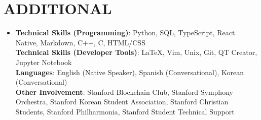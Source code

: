 \documentclass[letterpaper,12pt]{article}
\makeatletter
\newcommand{\resumeItem}[1]{
  \item\small{
    {#1 \vspace{-4pt}}
  }
}
\newcommand{\resumeSubheading}[4]{
  \vspace{-2pt}\item
    \begin{tabular*}{0.97\textwidth}[t]{l@{\extracolsep{\fill}}r}
      \vspace{-2pt}
      \textbf{\fontsize{11}{11}\selectfont #1} & \small#2 \\
      \textit{\small#3} & \textit{\small #4} \\
    \end{tabular*}\vspace{-10pt}
}
\newcommand{\resumeSubHeadingListStart}{\begin{itemize}[leftmargin=0in, label={}]}
\newcommand{\resumeSubHeadingListEnd}{\end{itemize}}
\newcommand{\resumeItemListStart}{\begin{itemize}[leftmargin=0.2in]}
\newcommand{\resumeItemListEnd}{\end{itemize}\vspace{-5pt}}
\makeatother
\begin{document}
%
%      

    \section{\textbf{ADDITIONAL}}
 \begin{itemize}[leftmargin=0in, label={}]
    \item{
        \textbf{Technical Skills (Programming)}{: \small{Python, SQL, TypeScript, React Native, Markdown, C++, C, HTML/CSS}} \\
        \vspace{1pt}
        \textbf{Technical Skills (Developer Tools)}{: \small{LaTeX, Vim, Unix, Git, QT Creator, Jupyter Notebook}} \\
        \vspace{1pt}
        \textbf{Languages}{: \small{English (Native Speaker), Spanish (Conversational), Korean (Conversational)}} \\
        \vspace{1pt}
        \textbf{Other Involvement}{: \small{Stanford Blockchain Club, Stanford Symphony Orchestra, Stanford Korean Student Association, Stanford Christian Students, Stanford Philharmonia, Stanford Student Technical Support}} \\
    }
 \end{itemize}
\end{document}
